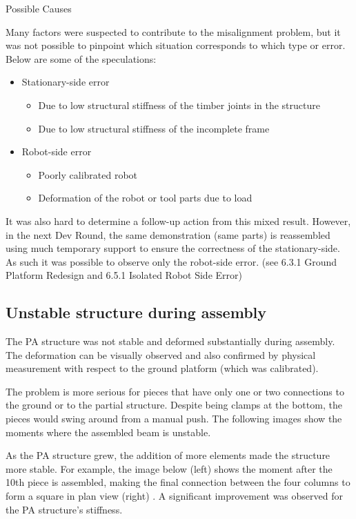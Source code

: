 Possible Causes

Many factors were suspected to contribute to the misalignment problem, but it was not possible to pinpoint which situation corresponds to which type or error. Below are some of the speculations:
\begin{itemize}
    \item Stationary-side error
    \begin{itemize}
        \item Due to low structural stiffness of the timber joints in the structure
        \item Due to low structural stiffness of the incomplete frame
    \end{itemize}
    \item Robot-side error
    \begin{itemize}
        \item Poorly calibrated robot
        \item Deformation of the robot or tool parts due to load
    \end{itemize}
\end{itemize}
    It was also hard to determine a follow-up action from this mixed result. However, in the next Dev Round, the same demonstration (same parts) is reassembled using much temporary support to ensure the correctness of the stationary-side. As such it was possible to observe only the robot-side error. (see 6.3.1 Ground Platform Redesign and 6.5.1 Isolated Robot Side Error)

\subsection{Unstable structure during assembly}

The PA structure was not stable and deformed substantially during assembly. The deformation can be visually observed and also confirmed by physical measurement with respect to the ground platform (which was calibrated).

The problem is more serious for pieces that have only one or two connections to the ground or to the partial structure. Despite being clamps at the bottom, the pieces would swing around from a manual push. The following images show the moments where the assembled beam is unstable.

As the PA structure grew, the addition of more elements made the structure more stable. For example, the image below (left) shows the moment after the 10th piece is assembled, making the final connection between the four columns to form a square in plan view (right) . A significant improvement was observed for the PA structure’s stiffness. 

